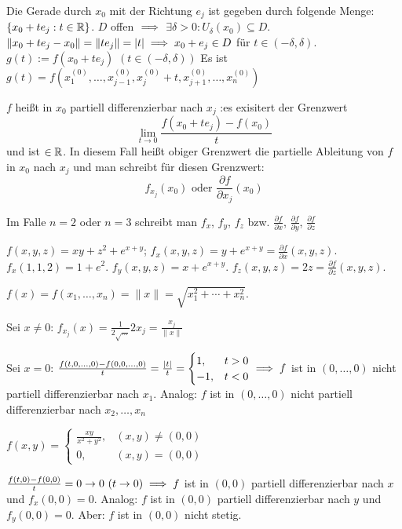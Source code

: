 \documentclass[a4paper,twoside,DIV15,BCOR12mm]{scrbook}
\begin{document}
Die Gerade durch $x_0$ mit der Richtung $e_j$ ist gegeben durch folgende Menge: $\{x_0+te_j:t\in\mathbb{R}\}$. $D$ offen $\implies$ $\exists\delta>0: U_\delta(x_0)\subseteq D$. $\|x_0+te_j - x_0\| = \|te_j\| = |t| \implies x_0+e_j \in D $ für $t\in(-\delta,\delta)$. $g(t) := f(x_0+te_j)$ $(t\in(-\delta,\delta))$
 Es ist $g(t) = f(x_1^{(0)}, \ldots, x_{j-1}^{(0)}, x_j^{(0)} + t, x_{j+1}^{(0)}, \ldots, x_n^{(0)} )$

\begin{definition}
$f$ heißt in $x_0$ partiell differenzierbar nach $x_j$ :\equizu es exisitert der Grenzwert $$\lim_{t\to0}\frac{f(x_0+te_j) - f(x_0)}t$$ und ist $\in\mathbb{R}$. In diesem Fall heißt obiger Grenzwert die partielle Ableitung von $f$ in $x_0$ nach $x_j$ und man schreibt für diesen Grenzwert: $$f_{x_j}(x_0) \text{ oder }\frac{\partial f}{\partial x_j}(x_0)$$

Im Falle $n=2$ oder $n=3$ schreibt man $f_x$, $f_y$, $f_z$ bzw. $\frac{\partial f}{\partial x}$, $\frac{\partial f}{\partial y}$, $\frac{\partial f}{\partial z}$
\end{definition}


\begin{beispiele}
\item $f(x,y,z) = xy+z^2+e^{x+y}$; $f_x(x,y,z) = y + e^{x+y} = \frac{\partial f}{\partial x}(x,y,z)$. $f_x(1,1,2)=1+e^2$. $f_y(x,y,z) = x+e^{x+y}$. $f_z(x,y,z) = 2z = \frac{\partial f}{\partial z}(x,y,z)$.
\item $f(x) = f(x_1,\ldots, x_n) = \|x\| = \sqrt{x_1^2 + \cdots + x_n^2}$.

Sei $x\ne0$: $f_{x_j}(x) = \frac{1}{2\sqrt{\ldots}}2x_j = \frac{x_j}{\|x\|} $

Sei $x=0$: $\frac{f(t,0,\ldots,0) - f(0,0,\ldots,0)}{t} = \frac{|t|}{t} = \begin{cases} 1, &t>0\\-1,&t<0\end{cases} \implies f$ ist in $(0,\ldots,0)$ nicht partiell differenzierbar nach $x_1$. Analog: $f$ ist in $(0,\ldots,0)$ nicht partiell differenzierbar nach $x_2,\ldots,x_n$
\item $f(x,y) = \begin{cases} \frac{xy}{x^2+y^2}, &(x,y)\ne(0,0)\\0,&(x,y) = (0,0) \end{cases}$

$\frac{f(t,0) - f(0,0)}{t} = 0 \to 0 \ (t\to0) \folgt f$ ist in $(0,0)$ partiell differenzierbar nach $x$ und $f_x(0,0) = 0$. Analog: $f$ ist in $(0,0)$ partiell differenzierbar nach $y$ und $f_y(0,0) = 0$. Aber: $f$ ist in $(0,0)$ nicht stetig.
\end{beispiele}
\end{document}
